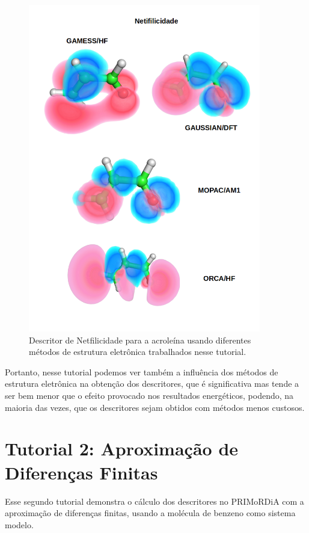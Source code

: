 \documentclass[a4paper,11pt]{refart}
\begin{document}
\hspace*{-\leftmarginwidth}
\begin{minipage}{\fullwidth}
\begin{figure}[H]
\begin{center}
\includegraphics[width=4in]{images/img11}
\caption{Descritor de Netfilicidade para a acroleína usando diferentes métodos de estrutura eletrônica trabalhados nesse tutorial.}
\label{fig_tut1_10}
\end{center}
\end{figure}
\end{minipage}

Portanto, nesse tutorial podemos ver também a influência dos métodos de estrutura eletrônica na obtenção dos descritores, que é significativa mas tende a ser bem menor que o efeito provocado nos resultados energéticos, podendo, na maioria das vezes, que os descritores sejam obtidos com métodos menos custosos. 

\newpage
\section{Tutorial 2: Aproximação de Diferenças Finitas}

Esse segundo tutorial demonstra o cálculo dos descritores no PRIMoRDiA com a aproximação de diferenças finitas, usando a molécula de benzeno como sistema modelo.  
\end{document}
